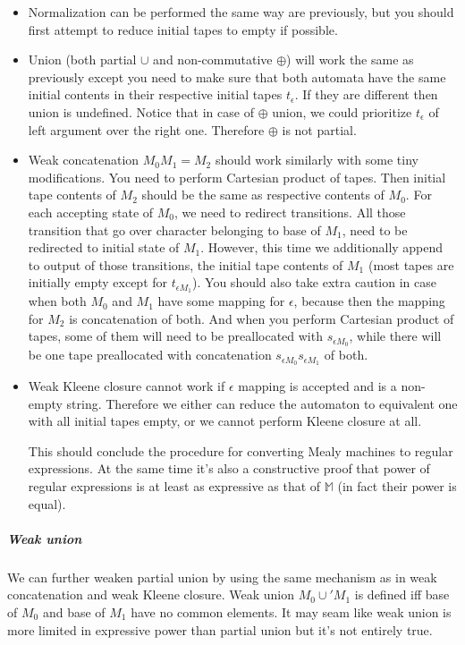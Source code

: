 \documentclass[12pt]{article}
\begin{document}
\begin{itemize}
	\item Normalization can be performed the same way are previously, but you should first attempt to reduce initial tapes to empty if possible.
	\item Union (both partial $\cup$ and non-commutative $\oplus$) will work the same as previously except you need to make sure that both automata have the same initial contents in their respective initial tapes $t_\epsilon$. If they are different then union is undefined. Notice that in case of $\oplus$ union, we could prioritize $t_\epsilon$ of left argument over the right one. Therefore $\oplus$ is not partial.
	\item Weak concatenation $M_0 M_1 = M_2$ should work similarly with some tiny modifications. You need to perform Cartesian product of tapes. Then initial tape contents of $M_2$ should be the same as respective contents of $M_0$. For each accepting state of $M_0$, we need to redirect transitions. All those transition that go over character belonging to base of $M_1$,  need to be redirected to initial state of $M_1$. However, this time we additionally append to output of those transitions, the initial tape contents of  $M_1$ (most tapes are initially empty except for $t_{\epsilon M_1}$). You should also take extra caution in case when both $M_0$ and $M_1$ have some mapping for  $\epsilon$, because then the mapping for $M_2$ is concatenation of both. And when you perform Cartesian  product of tapes, some of them will need to be preallocated with $s_{\epsilon M_0}$, while there will be one tape preallocated with concatenation $s_{\epsilon M_0}s_{\epsilon M_1}$ of both.
	\item Weak Kleene closure cannot work if $\epsilon$ mapping is accepted and is a non-empty string. Therefore we either can reduce the automaton to equivalent one with all initial tapes empty, or we cannot perform Kleene closure at all. 
	
	This should conclude the procedure for converting Mealy machines to regular expressions. At the same time it's also a constructive proof that power of regular expressions is at least as expressive as that of $\mathbb{ M}$ (in fact their power is equal).
	
\end{itemize}

\subparagraph{Weak union} We can further weaken partial union by using the same mechanism as in weak concatenation and weak Kleene closure. Weak union $M_0 \cup' M_1$ is defined iff base of $M_0$ and base of $M_1$ have no common elements. It may seam like weak union is more limited in expressive power than partial union but it's not entirely true.
\end{document}
